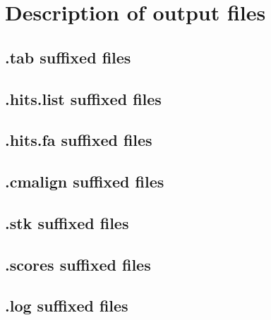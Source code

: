 \section{Description of output files}

\subsection{.tab suffixed files}
\subsection{.hits.list suffixed files}
\subsection{.hits.fa suffixed files}
\subsection{.cmalign suffixed files}
\subsection{.stk suffixed files}
\subsection{.scores suffixed files}
\subsection{.log suffixed files}
